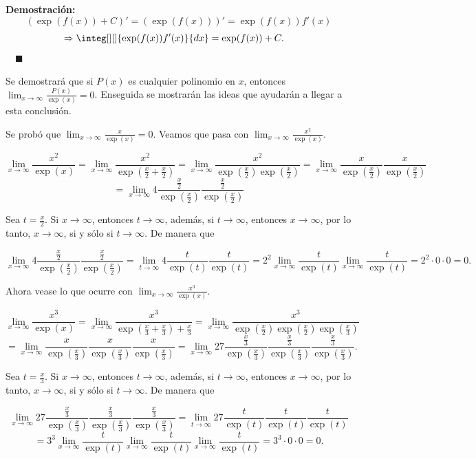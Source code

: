 \documentclass{article}
\numberwithin{equation}{section}
\newcommand{\Col}{\color{ProcessBlue}}
\newenvironment
{proof}
{\par\medskip\noindent\textbf{Demostración:}\rmfamily}
{\Col\hfill$\quad \blacksquare$\vspace{0.5cm}}
\begin{document}
\begin{proof}
    $$ {(\exp(f(x))+C)'}={(\exp(f(x)))'}=\exp(f(x))f'(x)$$
    $$\Rightarrow \integ[][]{\exp(f(x))f'(x)}{dx}=\exp(f(x))+C. \quad $$
\end{proof}

Se demostrará que si $P(x)$ es cualquier polinomio en $x$, entonces $\lim_{x\to\infty}\frac{P(x)}{\exp(x)}=0$. Enseguida se mostrarán las ideas que ayudarán a llegar a esta conclusión.

\vspace{0.5cm}

Se probó que $\lim_{x\to\infty}\frac{x}{\exp(x)}=0$. Veamos que pasa con $\lim_{x\to\infty}\frac{x^2}{\exp(x)}$.

$$ \lim_{x\to\infty}\frac{x^2}{\exp(x)}=\lim_{x\to\infty}\frac{x^2}{\exp(\frac{x}{2}+\frac{x}{2})}=\lim_{x\to\infty}\frac{x^2}{\exp(\frac{x}{2})\exp(\frac{x}{2})}=\lim_{x\to\infty}\frac{x}{\exp(\frac{x}{2})}\frac{x}{\exp(\frac{x}{2})} $$
$$ =\lim_{x\to\infty}4\frac{\frac{x}{2}}{\exp(\frac{x}{2})}\frac{\frac{x}{2}}{\exp(\frac{x}{2})} $$

Sea $t=\frac{x}{2}$. Si $x\to \infty$, entonces $t\to \infty$, además, si $t\to \infty$, entonces $x\to \infty$, por lo tanto, $x\to \infty$, si y sólo si $t\to \infty$. De manera que

$$ \lim_{x\to\infty}4\frac{\frac{x}{2}}{\exp(\frac{x}{2})}\frac{\frac{x}{2}}{\exp(\frac{x}{2})}=\lim_{t\to\infty}4\frac{t}{\exp(t)}\frac{t}{\exp(t)}=2^2\lim_{x\to\infty}\frac{t}{\exp(t)}\lim_{x\to\infty}\frac{t}{\exp(t)}=2^2\cdot 0\cdot 0=0.$$

Ahora vease lo que ocurre con $\lim_{x\to\infty}\frac{x^3}{\exp(x)}$.

$$ \lim_{x\to\infty}\frac{x^3}{\exp(x)}=\lim_{x\to\infty}\frac{x^3}{\exp(\frac{x}{3}+\frac{x}{3})+\frac{x}{3}}=\lim_{x\to\infty}\frac{x^3}{\exp(\frac{x}{2})\exp(\frac{x}{2})\exp(\frac{x}{3})}$$
$$=\lim_{x\to\infty}\frac{x}{\exp(\frac{x}{3})}\frac{x}{\exp(\frac{x}{3})}\frac{x}{\exp(\frac{x}{3})}=\lim_{x\to\infty}27\frac{\frac{x}{3}}{\exp(\frac{x}{3})}\frac{\frac{x}{3}}{\exp(\frac{x}{3})}\frac{\frac{x}{3}}{\exp(\frac{x}{3})}.$$

Sea $t=\frac{x}{3}$. Si $x\to \infty$, entonces $t\to \infty$, además, si $t\to \infty$, entonces $x\to \infty$, por lo tanto, $x\to \infty$, si y sólo si $t\to \infty$. De manera que

$$ \lim_{x\to\infty}27\frac{\frac{x}{3}}{\exp(\frac{x}{3})}\frac{\frac{x}{3}}{\exp(\frac{x}{3})}\frac{\frac{x}{3}}{\exp(\frac{x}{3})}=\lim_{t\to\infty}27\frac{t}{\exp(t)}\frac{t}{\exp(t)}\frac{t}{\exp(t)}$$
$$=3^3\lim_{x\to\infty}\frac{t}{\exp(t)}\lim_{x\to\infty}\frac{t}{\exp(t)}\lim_{x\to\infty}\frac{t}{\exp(t)}=3^3\cdot 0\cdot 0=0.$$
\end{document}

